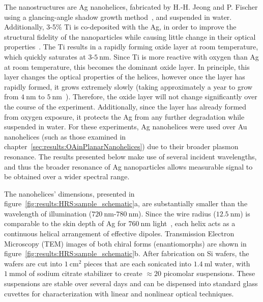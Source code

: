 The nanostructures are Ag nanohelices, fabricated by H.-H. Jeong and P. Fischer using a glancing-angle shadow growth method~\cite{Gibbs2014}, and suspended in water. 
Additionally, 3-5$\%$ Ti is co-deposited with the Ag, in order to improve the structural fidelity of the nanoparticles while causing little change in their optical properties~\cite{Larsen2014b}. The Ti results in a rapidly forming oxide layer at room temperature, which quickly saturates at 3-$\SI{5}{\nano\m}$. Since Ti is more reactive with oxygen than Ag at room temperature, this becomes the dominant oxide layer. 
In principle, this layer changes the optical properties of the helices, however once the layer has rapidly formed, it grows extremely slowly (taking approximately a year to grow from $\SI{4}{\nano\m}$ to $\SI{5}{\nano\m}$~\cite[\S 7.3]{Brunette2001}). 
Therefore, the oxide layer will not change significantly over the course of the experiment. Additionally, since the layer has already formed from oxygen exposure, it protects the Ag from any further degradation while suspended in water.
For these experiments, Ag nanohelices were used over Au nanohelices (such as those examined in chapter~\ref{sec:results:OAinPlanarNanohelices}) due to their broader plasmon resonance. The results presented below make use of several incident wavelengths, and thus the broader resonance of Ag nanoparticles allows measurable signal to be obtained over a wider spectral range.

The nanohelices' dimensions, presented in figure~\ref{fig:results:HRS:sample_schematic}a, are substantially smaller than the wavelength of illumination ($\SI{720}{\nano\m}$-$\SI{780}{\nano\m}$). Since the wire radius ($\SI{12.5}{\nano\m}$) is comparable to the skin depth of Ag for $\SI{760}{\nano\m}$ light~\cite{Johnson1972}, each helix acts as a continuous helical arrangement of effective dipoles. Transmission Electron Microscopy (TEM) images of both chiral forms (enantiomorphs) are shown in figure~\ref{fig:results:HRS:sample_schematic}b. 
After fabrication on Si wafers, the wafers are cut into $\SI{1}{\centi\meter\squared}$ pieces that are each sonicated into $\SI{1.4}{\milli\litre}$ water, with $\SI{1}{\milli\mole}$ of sodium citrate stabilizer to create $\approx 20$ picomolar suspensions. These suspensions are stable over several days and can be dispensed into standard glass cuvettes for characterization with linear and nonlinear optical techniques.  

